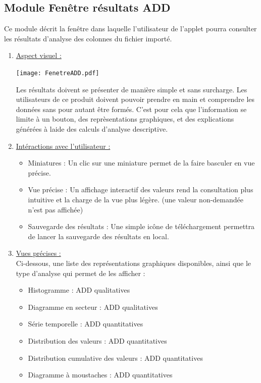 		\subsection{Module Fenêtre résultats ADD}
			Ce module décrit la fenêtre dans laquelle l'utilisateur de l'applet pourra consulter les résultats d'analyse des colonnes du fichier importé.
			\begin{enumerate}
				\item \underline{Aspect visuel :}\\
					\begin{center}\texttt{[image: FenetreADD.pdf]}\end{center}
					Les résultats doivent se présenter de manière simple et sans surcharge. Les utilisateurs de ce produit doivent pouvoir prendre en main et comprendre les données sans pour autant être formés. C'est pour cela que l'information se limite à un bouton, des reprèsentations graphiques, et des explications générées à laide des calculs d'analyse descriptive.
				\item \underline{Intéractions avec l'utilisateur :}\\
					\begin{itemize}
						\item Miniatures : Un clic sur une miniature permet de la faire basculer en vue précise.
						\item Vue précise : Un affichage interactif des valeurs rend la consultation plus intuitive et la charge de la vue plus légère. (une valeur non-demandée n'est pas affichée)
						\item Sauvegarde des résultats : Une simple icône de téléchargement permettra de lancer la sauvegarde des résultats en local.
					\end{itemize}
				\item \underline{Vues précises :}\\
					Ci-dessous, une liste des représentations graphiques disponibles, ainsi que le type d'analyse qui permet de les afficher :
					\begin{itemize}
						\item Histogramme : ADD qualitatives
						\item Diagramme en secteur : ADD qualitatives
						\item Série temporelle : ADD quantitatives
						\item Distribution des valeurs : ADD quantitatives
						\item Distribution cumulative des valeurs : ADD quantitatives
						\item Diagramme à moustaches : ADD quantitatives
					\end{itemize}
			\end{enumerate}
	
